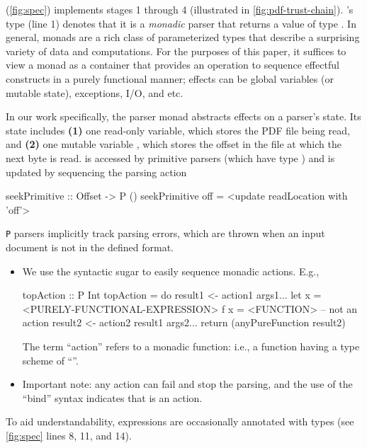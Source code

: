  (\cref{fig:spec}) implements stages 1 through 4 (illustrated in \cref{fig:pdf-trust-chain}).
% 
's type (line 1) denotes that it
is a \emph{monadic} parser  that returns a value of type
.
%
In general, monads are a rich class of parameterized types that
describe a surprising variety of data and computations.
%
For the purposes of this paper, it suffices to view a monad as a container that provides an operation to sequence effectful constructs in a purely functional manner; effects can be global variables (or mutable state), exceptions, I/O, and etc.

%
In our work specifically, the parser monad  abstracts effects on a parser's state.
%
Its state includes %
\textbf{(1)} one read-only variable, which stores the PDF file being read, and %
\textbf{(2)} one mutable variable \rdloc{}, which stores the offset in the file at which the next byte is read.
%
\rdloc{} is accessed by primitive parsers (which have type )
and is updated by sequencing the parsing action
\begin{codeNoExecute}
  seekPrimitive :: Offset -> P ()
  seekPrimitive off = <update readLocation with 'off'>
\end{codeNoExecute}
%
%
\texttt{P} parsers implicitly track parsing errors, which are thrown when an input document is not in the defined format.

%
\begin{itemize}
\item We use the  syntactic sugar to easily sequence
  monadic actions.
  E.g.,
  \begin{codeNoExecute}
  topAction :: P Int
  topAction = do
              result1 <- action1 args1...
              let x = <PURELY-FUNCTIONAL-EXPRESSION>
                  f x = <FUNCTION> -- not an action
              result2 <- action2 result1 args2...
              return (anyPureFunction result2)
  \end{codeNoExecute}
  The term ``action'' refers to a monadic function: i.e., a function
  having a type scheme of ``''.
\item Important note: any action can fail and stop the parsing,
  and the use of the  ``bind'' syntax indicates
  that  is an action.
\end{itemize}

To aid understandability, expressions are occasionally annotated with types (see \cref{fig:spec} lines 8, 11, and 14).

